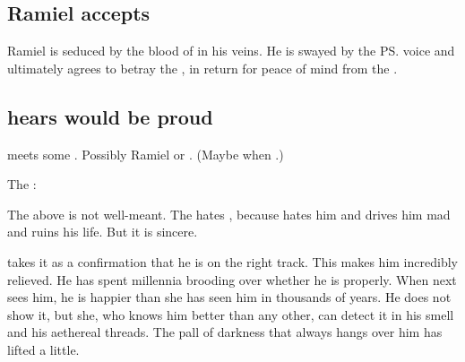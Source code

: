 \subsection{Ramiel accepts \NexagglachelsCurse}
Ramiel is seduced by the blood of \Nexagglachel{} in his veins. 
He is swayed by the \ps{\dragonlord} voice and ultimately agrees to betray the \banelords, in return for peace of mind from the .








\subsection{\Ishnaruchaefir hears \Nexagglachel would be proud}
\Ishnaruchaefir{} meets some \sathariah. 
Possibly Ramiel or \Azraid. 
(Maybe when .) 

\begin{prose}
  The \sathariah: 
\end{prose}

The above is not well-meant. 
The \sathariah{} hates \Nexagglachel, because \Nexagglachel{} hates him and drives him mad and ruins his life. 
But it is sincere. 

\Ishnaruchaefir{} takes it as a confirmation that he is on the right track. 
This makes him incredibly relieved. 
He has spent millennia brooding over whether he is  properly. 
When \Criseis{} next sees him, he is happier than she has seen him in thousands of years. 
He does not show it, but she, who knows him better than any other, can detect it in his smell and his aethereal threads. 
The pall of darkness that always hangs over him has lifted a little. 










